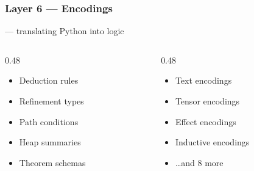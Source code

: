 \begin{frame}
\frametitle{Layer 6 --- Encodings}
\begin{center}
  {\Large {} --- translating Python into logic}
\end{center}
\vspace{8pt}
\begin{columns}[T]
\begin{column}{0.48\textwidth}
  \begin{itemize}
    \item Deduction rules
    \item Refinement types
    \item Path conditions
    \item Heap summaries
    \item Theorem schemas
  \end{itemize}
\end{column}
\begin{column}{0.48\textwidth}
  \begin{itemize}
    \item Text encodings
    \item Tensor encodings
    \item Effect encodings
    \item Inductive encodings
    \item \ldots and 8 more
  \end{itemize}
\end{column}
\end{columns}
\vfill
\begin{center}
\end{center}
\end{frame}


